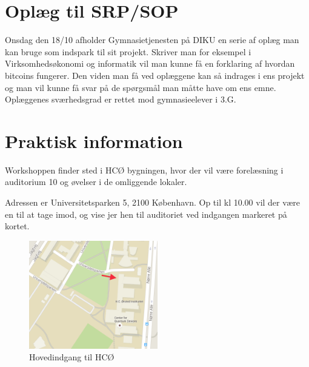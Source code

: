 \documentclass{article}                                                        %
\begin{document}
\section{Oplæg til SRP/SOP}
    Onsdag den 18/10 afholder Gymnasietjenesten på DIKU en serie af oplæg man
    kan bruge som indspark til sit projekt. Skriver man for eksempel i
    Virksomhedsøkonomi og informatik vil man kunne få en forklaring af hvordan
    bitcoins fungerer. Den viden man få ved oplæggene kan så indrages i ens
    projekt og man vil kunne få svar på de spørgsmål man måtte have om ens emne.
    Oplæggenes sværhedsgrad er rettet mod gymnasieelever i 3.G.



\section{Praktisk information}
    Workshoppen finder sted i HCØ bygningen, hvor der vil være forelæsning i
    auditorium 10 og øvelser i de omliggende  lokaler.

    Adressen er Universitetsparken 5, 2100 København.
    Op til kl 10.00 vil der være en til at tage imod, og vise jer hen til
    auditoriet ved indgangen markeret på kortet.
    \begin{figure}[h!]
        \caption{Hovedindgang til HCØ}
        \centering
        \includegraphics[width=0.5\textwidth]{./include/kort.png}
    \end{figure}
\end{document}
